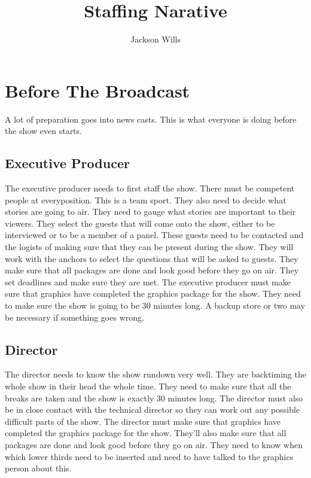 \documentclass[letterpaper,10pt,oneside]{article}
\title{Staffing Narative}
\author{Jackson Wills}
\begin{document}
\maketitle

\tableofcontents

\clearpage

\section{Before The Broadcast}
A lot of preparation goes into news casts. This is what everyone is doing before the show even starts.

\subsection{Executive Producer}
The executive producer needs to first staff the show. There must be competent people at everyposition. This is a team sport. They also need to decide what stories are going to air. They need to gauge what stories are important to their viewers. They select the guests that will come onto the show, either to be interviewed or to be a member of a panel. These guests need to be contacted and the logists of making sure that they can be present during the show. They will work with the anchors to select the questions that will be asked to guests. They make sure that all packages are done and look good before they go on air. They set deadlines and make sure they are met.
The executive producer must make sure that graphics have completed the graphics package for the show. They need to make sure the show is going to be 30 minutes long. A backup store or two may be necessary if something goes wrong.

\subsection{Director}
The director needs to know the show rundown very well. They are backtiming the whole show in their head the whole time. They need to make sure that all the breaks are taken and the show is exactly 30 minutes long.
The director must also be in close contact with the technical director so they can work out any possible difficult parts of the show. The director must make sure that graphics have completed the graphics package for the show.
They'll also make sure that all packages are done and look good before they go on air. They need to know when which lower thirds need to be inserted and need to have talked to the graphics person about this.
\end{document}
